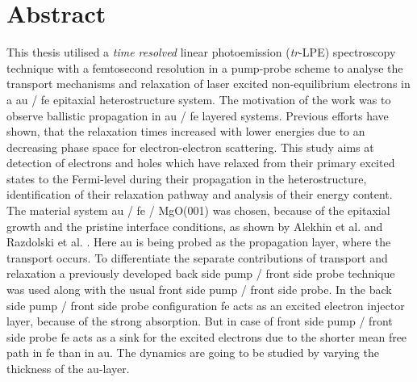 \documentclass[a4paper,12pt,twoside]{article}
\begin{document}
\newpage
\null
\thispagestyle{empty}
\newpage
{}
    \section*{Abstract}
\renewcommand{\baselinestretch}{1.2}\normalsize
This thesis utilised a \textit{time resolved} linear photoemission (\textit{tr}-LPE) spectroscopy technique with a femtosecond resolution in a pump-probe scheme to analyse the transport mechanisms and relaxation of laser excited non-equilibrium electrons in a \gls{au} / \gls{fe} epitaxial heterostructure system. The motivation of the work was to observe ballistic propagation in \gls{au} / \gls{fe} layered systems. Previous efforts have shown, that the relaxation times increased with lower energies due to an decreasing phase space for electron-electron scattering. This study aims at detection of electrons and holes which have relaxed from their primary excited states to the Fermi-level during their propagation in the heterostructure, identification of their relaxation pathway and analysis of their energy content. The material system \gls{au} / \gls{fe} / MgO(001) was chosen, because of the epitaxial growth and the pristine interface conditions, as shown by Alekhin et al. \cite{Alekhin2017} and Razdolski et al. \cite{Razdolski2017}. Here \gls{au} is being probed as the propagation layer, where the transport occurs. To differentiate the separate contributions of transport and relaxation a previously developed back side pump / front side probe technique was used along with the usual front side pump / front side probe. In the back side pump / front side probe configuration \gls{fe} acts as an excited electron injector layer, because of the strong absorption. But in case of front side pump / front side probe \gls{fe} acts as a sink for the excited electrons due to the shorter mean free path in \gls{fe} than in \gls{au}. The dynamics are going to be studied by varying the thickness of the \gls{au}-layer. 
\end{document}
